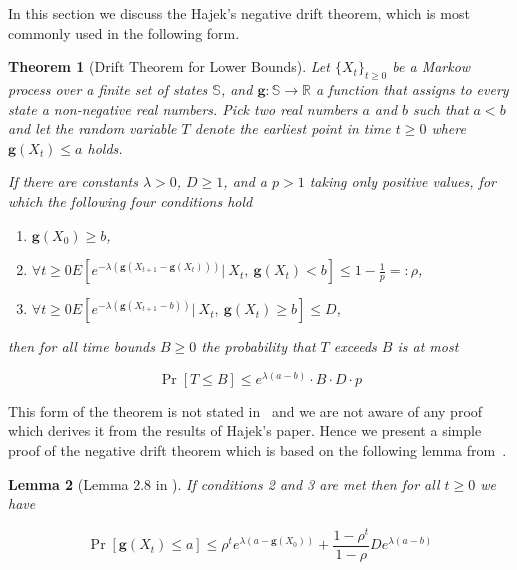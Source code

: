 \documentclass[12pt, a4paper]{article}
\newcommand{\gfun}{\mathbf{g}}
\newtheorem{theorem}{Theorem}[section]
\newtheorem{lemma}[theorem]{Lemma}
\theoremstyle{remark}
\begin{document}
In this section we discuss the Hajek's negative drift theorem, which is most commonly used in the following form.

\begin{theorem}[Drift Theorem for Lower Bounds] \label{thm:neat}
    Let $\{X_t\}_{t \ge 0}$ be a Markow process over a finite set of states $\mathbb{S}$, and $\mathbf{g} : \mathbb{S} \rightarrow \mathbb{R}$ a function that assigns to every state a non-negative real numbers. Pick two real numbers $a$ and $b$ such that $a < b$ and let the random variable $T$ denote
    the earliest point in time $t \ge 0$ where $\mathbf{g}(X_t) \leq a$ holds.

    If there are constants $\lambda > 0$, $D \ge 1$, and a $p > 1$ taking only positive values, for which the following four conditions hold
    \renewcommand\labelenumi{(\theenumi)}
    \begin{enumerate}
        \item $\gfun(X_0) \ge b$,
        \item $\forall t \ge 0 E\left[e^{-\lambda(\gfun(X_{t + 1} - \gfun(X_t)))} |\ X_t,\ \gfun(X_t) < b\right] \leq 1 - \frac{1}{p} =: \rho$,
        \item $\forall t \ge 0 E\left[e^{-\lambda(\gfun(X_{t + 1} - b))} |\ X_t,\ \gfun(X_t) \ge b\right] \leq D$,
    \end{enumerate}
    then for all time bounds $B \ge 0$ the probability that $T$ exceeds $B$ is at most

    \begin{equation}
        \Pr[T \leq B] \leq e^{\lambda(a - b)} \cdot B \cdot D \cdot p
    \end{equation}
\end{theorem}

This form of the theorem is not stated in~\cite{Hajek82} and we are not aware of any proof which derives it from the results of Hajek's paper. Hence we present a simple proof of the negative drift theorem which is based on the following lemma from~\cite{Hajek82}.

\begin{lemma}[Lemma 2.8 in \cite{Hajek 82}] \label{lm:haj}
    If conditions 2 and 3 are met then for all $t \geq 0$ we have

    $$\Pr[\gfun(X_t) \leq a] \leq \rho^te^{\lambda(a - \gfun(X_0))} + \frac{1 - \rho^t}{1 - \rho} D e^{\lambda(a - b)}$$

\end{lemma}
\end{document}
